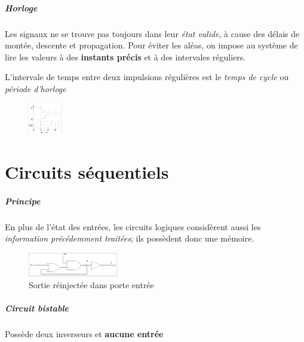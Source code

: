 \documentclass{report}
\begin{document}
\begin{multicols*}{3}
   \paragraph{Horloge}
   Les signaux ne se trouve pas toujours dans leur 
   \textit{état valide}, à cause des délais de montée, descente 
   et propagation. Pour éviter les aléas, on impose au 
   système de lire les valeurs à des \textbf{instants précis}  
   et à des intervales réguliers. 

   L'intervale de temps entre deux impulsions régulières 
   est le \textit{temps de cycle} ou \textit{période d'horloge}    


   \begin{figure}[H]
    \begin{center}
      \includegraphics[width=0.13\textwidth]{ExempleHorloge.png}
    \end{center}
   \end{figure}

   \chapter{Circuits séquentiels}

   \paragraph{Principe}
   En plus de l'état des entrées, les circuits 
   logiques considèrent aussi les 
   \textit{information précédemment traitées}; 
   ils possèdent donc une mémoire. 


   \begin{figure}[H]
    \begin{center}
      \includegraphics[width=0.35\textwidth]{exCircsequentiel.png}
    \end{center}
    \caption{Sortie réinjectée dans porte entrée}
   \end{figure}


   \paragraph{Circuit bistable}
   Possède deux inverseurs et \textbf{aucune entrée} 


\end{multicols*}
\end{document}
